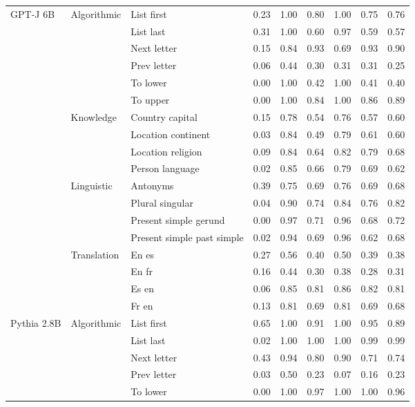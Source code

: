 \begin{center}
\begin{longtable}{lllrrrrrr}
\multirow[t]{18}{*}{GPT-J 6B} & \multirow[t]{6}{*}{Algorithmic} & List first & 0.23 & 1.00 & 0.80 & 1.00 & 0.75 & 0.76 \\
 &  & List last & 0.31 & 1.00 & 0.60 & 0.97 & 0.59 & 0.57 \\
 &  & Next letter & 0.15 & 0.84 & 0.93 & 0.69 & 0.93 & 0.90 \\
 &  & Prev letter & 0.06 & 0.44 & 0.30 & 0.31 & 0.31 & 0.25 \\
 &  & To lower & 0.00 & 1.00 & 0.42 & 1.00 & 0.41 & 0.40 \\
 &  & To upper & 0.00 & 1.00 & 0.84 & 1.00 & 0.86 & 0.89 \\
\cline{2-9}
 & \multirow[t]{4}{*}{Knowledge} & Country capital & 0.15 & 0.78 & 0.54 & 0.76 & 0.57 & 0.60 \\
 &  & Location continent & 0.03 & 0.84 & 0.49 & 0.79 & 0.61 & 0.60 \\
 &  & Location religion & 0.09 & 0.84 & 0.64 & 0.82 & 0.79 & 0.68 \\
 &  & Person language & 0.02 & 0.85 & 0.66 & 0.79 & 0.69 & 0.62 \\
\cline{2-9}
 & \multirow[t]{4}{*}{Linguistic} & Antonyms & 0.39 & 0.75 & 0.69 & 0.76 & 0.69 & 0.68 \\
 &  & Plural singular & 0.04 & 0.90 & 0.74 & 0.84 & 0.76 & 0.82 \\
 &  & Present simple gerund & 0.00 & 0.97 & 0.71 & 0.96 & 0.68 & 0.72 \\
 &  & Present simple past simple & 0.02 & 0.94 & 0.69 & 0.96 & 0.62 & 0.68 \\
\cline{2-9}
 & \multirow[t]{4}{*}{Translation} & En es & 0.27 & 0.56 & 0.40 & 0.50 & 0.39 & 0.38 \\
 &  & En fr & 0.16 & 0.44 & 0.30 & 0.38 & 0.28 & 0.31 \\
 &  & Es en & 0.06 & 0.85 & 0.81 & 0.86 & 0.82 & 0.81 \\
 &  & Fr en & 0.13 & 0.81 & 0.69 & 0.81 & 0.69 & 0.68 \\
\cline{1-9} \cline{2-9}
\multirow[t]{18}{*}{Pythia 2.8B} & \multirow[t]{6}{*}{Algorithmic} & List first & 0.65 & 1.00 & 0.91 & 1.00 & 0.95 & 0.89 \\
 &  & List last & 0.02 & 1.00 & 1.00 & 1.00 & 0.99 & 0.99 \\
 &  & Next letter & 0.43 & 0.94 & 0.80 & 0.90 & 0.71 & 0.74 \\
 &  & Prev letter & 0.03 & 0.50 & 0.23 & 0.07 & 0.16 & 0.23 \\
 &  & To lower & 0.00 & 1.00 & 0.97 & 1.00 & 1.00 & 0.96 \\

\end{longtable}
\end{center}

